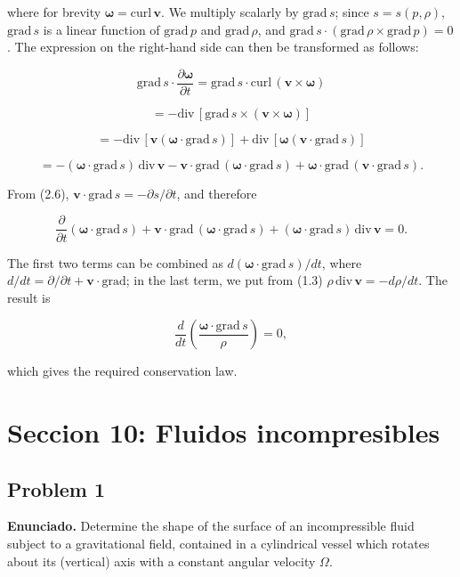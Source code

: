 \documentclass{article}
\begin{document}
where for brevity $\boldsymbol{\omega} = \text{curl} \, \mathbf{v}$. We multiply scalarly by $\text{grad} \, s$; since $s = s(p, \rho)$, $\text{grad} \, s$ is a linear function of $\text{grad} \, p$ and $\text{grad} \, \rho$, and $\text{grad} \, s \cdot (\text{grad} \, \rho \times \text{grad} \, p) = 0$. The expression on the right-hand side can then be transformed as follows:

$$
\text{grad} \, s \cdot \frac{\partial \boldsymbol{\omega}}{\partial t} = \text{grad} \, s \cdot \text{curl} \, (\mathbf{v} \times \boldsymbol{\omega})
$$

$$
= -\text{div} \, [\text{grad} \, s \times (\mathbf{v} \times \boldsymbol{\omega})]
$$

$$
= -\text{div} \, [\mathbf{v} (\boldsymbol{\omega} \cdot \text{grad} \, s)] + \text{div} \, [\boldsymbol{\omega} (\mathbf{v} \cdot \text{grad} \, s)]
$$

$$
= -(\boldsymbol{\omega} \cdot \text{grad} \, s) \, \text{div} \, \mathbf{v} - \mathbf{v} \cdot \text{grad} \, (\boldsymbol{\omega} \cdot \text{grad} \, s) + \boldsymbol{\omega} \cdot \text{grad} \, (\mathbf{v} \cdot \text{grad} \, s).
$$

From (2.6), $\mathbf{v} \cdot \text{grad} \, s = -\partial s/\partial t$, and therefore

$$
\frac{\partial}{\partial t} (\boldsymbol{\omega} \cdot \text{grad} \, s) + \mathbf{v} \cdot \text{grad} \, (\boldsymbol{\omega} \cdot \text{grad} \, s) + (\boldsymbol{\omega} \cdot \text{grad} \, s) \, \text{div} \, \mathbf{v} = 0.
$$

The first two terms can be combined as $d(\boldsymbol{\omega} \cdot \text{grad} \, s)/dt$, where $d/dt = \partial/\partial t + \mathbf{v} \cdot \text{grad}$; in the last term, we put from (1.3) $\rho \, \text{div} \, \mathbf{v} = -d\rho/dt$. The result is

$$
\frac{d}{dt} \left( \frac{\boldsymbol{\omega} \cdot \text{grad} \, s}{\rho} \right) = 0,
$$

which gives the required conservation law.

\section*{Seccion 10: Fluidos incompresibles}
\subsection*{Problem 1}

\textbf{Enunciado.} Determine the shape of the surface of an incompressible fluid subject to a gravitational field, contained in a cylindrical vessel which rotates about its (vertical) axis with a constant angular velocity $\Omega$.
\end{document}
